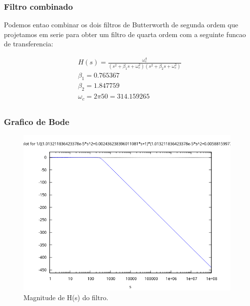 \documentclass[12pt,twoside, a4paper, twocolumn]{article}
\begin{document}
\subsubsection{Filtro combinado}

Podemos entao combinar os dois filtros de Butterworth de segunda ordem que projetamos em serie para obter um filtro de quarta ordem com a seguinte funcao de transferencia:

\begin{equation}
    \begin{aligned}
         & H(s) = \frac{\omega_c^4}{\left( s^2 + \beta_1 s + \omega_c^2 \right) \left( s^2 + \beta_2 s + \omega_c^2 \right)} \\
         & \beta_1 = 0.765367                                                                                                \\
         & \beta_2 = 1.847759                                                                                                \\
         & \omega_c = 2 \pi 50 = 314.159265                                                                                  \\
    \end{aligned}
\end{equation}


\subsubsection{Grafico de Bode}

\begin{figure}[h]
    \centering
    \includegraphics[width=1\columnwidth]{images/bodegain.png}
    \caption{Magnitude de H(s) do filtro.}
\end{figure}
\end{document}
